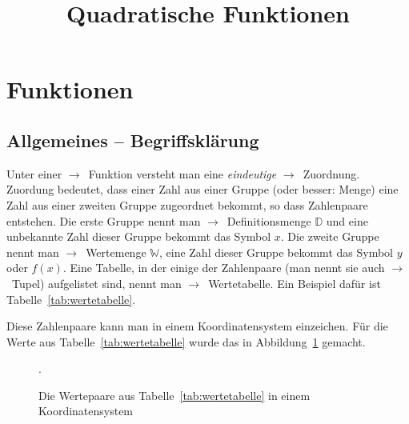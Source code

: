 \documentclass{arbeitsblatt}
\title{Quadratische Funktionen}
\newcommand*\menge[1]{\mathbb{#1}}
\newcommand*\siehe{$\rightarrow$~}
\newcommand*\begriff{\siehe\ac}
\begin{document}
\maketitle

\tableofcontents

\section{Funktionen}
\subsection{Allgemeines -- Begriffsklärung}

Unter einer \begriff{Funktion} versteht man eine \emph{eindeutige}
\begriff{Zuordnung}.  Zuordung bedeutet, dass einer Zahl aus einer Gruppe
(oder besser: Menge) eine Zahl aus einer zweiten Gruppe zugeordnet bekommt, so
dass Zahlenpaare entstehen.  Die erste Gruppe nennt man
\begriff{Definitionsmenge} $\menge{D}$ und eine unbekannte Zahl dieser Gruppe
bekommt das Symbol $x$.  Die zweite Gruppe nennt man \begriff{Wertemenge}
$\menge{W}$, eine Zahl dieser Gruppe bekommt das Symbol $y$ oder $f(x)$.  Eine
Tabelle, in der einige der Zahlenpaare (man nennt sie auch \begriff{Tupel})
aufgelistet sind, nennt man \begriff{Wertetabelle}.  Ein Beispiel dafür ist
Tabelle~\ref{tab:wertetabelle}.

\begin{table}
  \centering
  \caption{Beispiel für eine Wertetabelle.}
  \label{tab:wertetabelle}
\end{table}

Diese Zahlenpaare kann man in einem Koordinatensystem einzeichen.  Für die
Werte aus Tabelle~\ref{tab:wertetabelle} wurde das in
Abbildung~\ref{fig:wertepaare} gemacht.

\begin{figure}
  \centering
  \caption{Die Wertepaare aus Tabelle~\ref{tab:wertetabelle} in einem
    Koordinatensystem}.
  \label{fig:wertepaare}
\end{figure}
\end{document}
